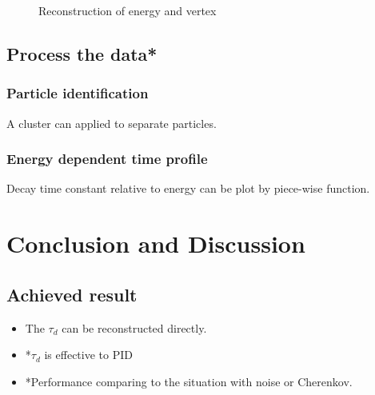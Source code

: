 \documentclass{article}
\begin{document}
\begin{figure}[htbp]
%
%
\centering
\caption{ Reconstruction of energy and vertex}
\label{fig:4}
\end{figure}

\subsection{Process the data*} 
\subsubsection{Particle identification}
\par A cluster can applied to separate particles.
\subsubsection{Energy dependent time profile}
\par Decay time constant relative to energy can be plot by piece-wise function.

\section{Conclusion and Discussion}
\subsection{Achieved result}
\begin{itemize}
\item The $\tau_d$ can be reconstructed directly.
\item *$\tau_d$ is effective to PID
\item *Performance comparing to the situation with noise or Cherenkov. 
\end{itemize}
\end{document}
